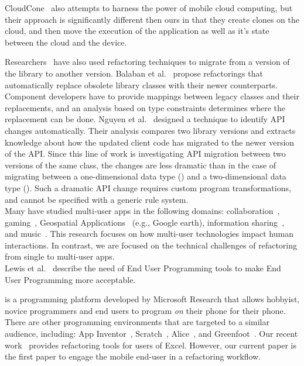 \documentclass[article]{sigplanconf}
\begin{document}
CloudCone~\cite{chun2011clonecloud} also attempts to harness the power of mobile cloud computing, but their approach is significantly different then ours in that they create clones on the cloud, and then move the execution of the application as well as it's state between the cloud and the device.  

Researchers~\cite{BalabanTF05,Nguyen2010} have also used refactoring techniques to migrate from a version of the library to another version. Balaban et al.~\cite{BalabanTF05} propose
refactorings that automatically replace obsolete library classes with their newer counterparts. Component developers have to provide mappings between legacy classes and their replacements, and an analysis based on type constraints determines where the replacement can be done. Nguyen et al.~\cite{Nguyen2010} designed a technique to identify API changes automatically. Their analysis compares two library versions and extracts knowledge about how the updated client code has migrated to the newer version of the API. 
Since this line of work is investigating API migration between two versions of the same class, the changes are less dramatic than in the case of migrating between a 
one-dimensional data type (\NC) and a two-dimensional data type (\CDT). Such a dramatic API change requires custom program transformations, and cannot be specified with a generic rule system. \\


Many have studied multi-user apps in the following domains: collaboration~\cite{Yuill:multiuserColab, Lopez-Gulliver:imageprocessing}, gaming~\cite{Leichtenstern:multiuserGames}, Geospatial Applications~\cite{Forlines:geospatial} (e.g., Google earth), information sharing~\cite{Nacenta:2012:LMM:2307798.2307816}, and music~\cite{Sorensen:2012:ISM:2399016.2399094}. This research focuses on how multi-user technologies impact human interactions. In contrast, we are focused on the technical challenges of refactoring from single to multi-user apps. \\

Lewis et al.~\cite{lewis2009report} describe the need of End User Programming tools to make End User Programming more acceptable.  

\TD is a programming platform developed by Microsoft Research that allows hobbyist, novice programmers and end users  to program \emph{on} their phone for their phone.  There are other programming environments that are targeted to a similar audience, including:  App Inventor~\cite{Wolber}, Scratch~\cite{maloney2010scratch}, Alice~\cite{cooper2010design}, and Greenfoot~\cite{kolling2010greenfoot}. 
Our recent work~\cite{badame2012refactoring} provides refactoring tools for users of Excel. 
However, our current paper is the first paper to engage the mobile end-user in a refactoring workflow.
\end{document}
